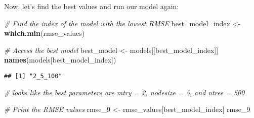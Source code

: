 \documentclass[
]{article}
\newenvironment{Shaded}{\begin{snugshade}}{\end{snugshade}}
\newcommand{\AttributeTok}[1]{\textcolor[rgb]{0.13,0.29,0.53}{#1}}
\newcommand{\CommentTok}[1]{\textcolor[rgb]{0.56,0.35,0.01}{\textit{#1}}}
\newcommand{\ControlFlowTok}[1]{\textcolor[rgb]{0.13,0.29,0.53}{\textbf{#1}}}
\newcommand{\FunctionTok}[1]{\textcolor[rgb]{0.13,0.29,0.53}{\textbf{#1}}}
\newcommand{\NormalTok}[1]{#1}
\newcommand{\OtherTok}[1]{\textcolor[rgb]{0.56,0.35,0.01}{#1}}
\newcommand{\SpecialCharTok}[1]{\textcolor[rgb]{0.81,0.36,0.00}{\textbf{#1}}}
\newcommand{\StringTok}[1]{\textcolor[rgb]{0.31,0.60,0.02}{#1}}
\begin{document}
\begin{Shaded}
\end{Shaded}

Now, let's find the best values and run our model again:

\begin{Shaded}
\begin{Highlighting}[]
\CommentTok{\# Find the index of the model with the lowest RMSE}
\NormalTok{best\_model\_index }\OtherTok{\textless{}{-}} \FunctionTok{which.min}\NormalTok{(rmse\_values)}

\CommentTok{\# Access the best model}
\NormalTok{best\_model }\OtherTok{\textless{}{-}}\NormalTok{ models[[best\_model\_index]]}
\FunctionTok{names}\NormalTok{(models[best\_model\_index])}
\end{Highlighting}
\end{Shaded}

\begin{verbatim}
## [1] "2_5_100"
\end{verbatim}

\begin{Shaded}
\begin{Highlighting}[]
\CommentTok{\# looks like the best parameters are mtry = 2, nodesize = 5, and ntree = 500}

\CommentTok{\# Print the RMSE values}
\NormalTok{rmse\_9 }\OtherTok{\textless{}{-}}\NormalTok{ rmse\_values[best\_model\_index]}
\NormalTok{rmse\_9}
\end{Highlighting}
\end{Shaded}
\end{document}
